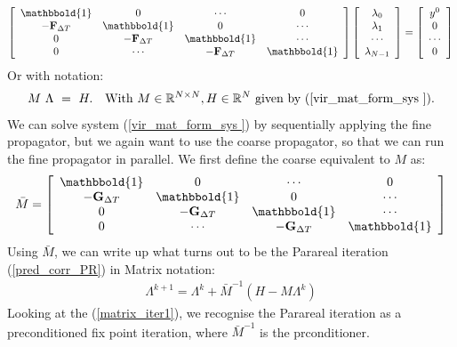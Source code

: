\begin{align}
  \left[ \begin{array}{cccc}
   \mathbbold{1} & 0 & \cdots & 0 \\  
   -\bold{F}_{\Delta T} & \mathbbold{1} & 0 & \cdots \\ 
   0 &-\bold{F}_{\Delta T} & \mathbbold{1}  & \cdots \\
   0 &\cdots &-\bold{F}_{\Delta T} & \mathbbold{1}  \\
   \end{array}  \right] 
   \left[ \begin{array}{c}
   \lambda_0 \\
   \lambda_1 \\
   \cdots \\
   \lambda_{N-1} \\
   \end{array}  \right] =
   \left[ \begin{array}{c}
   y^0 \\
   0 \\
   \cdots \\
   0 \\
   \end{array}  \right] \label{vir_mat_form_sys }
\end{align}
Or with notation:
\begin{align}
M \ \Lambda \ = \ H.\quad \textrm{With $M\in\mathbb{R}^{N\times N},H\in\mathbb{R}^N$ given by (\ref{vir_mat_form_sys }).} \label{vir_mat_sys}
\end{align}
We can solve system (\ref{vir_mat_form_sys }) by sequentially applying the fine propagator, but we again want to use the coarse propagator, so that we can run the fine propagator in parallel. We first define the coarse equivalent to $M$ as:
\begin{align}
\bar{M} = \left[ \begin{array}{cccc}
   \mathbbold{1} & 0 & \cdots & 0 \\  
   -\bold{G}_{\Delta T} & \mathbbold{1} & 0 & \cdots \\ 
   0 &-\bold{G}_{\Delta T} & \mathbbold{1}  & \cdots \\
   0 &\cdots &-\bold{G}_{\Delta T} & \mathbbold{1}   \\
   \end{array}  \right]
\end{align}
Using $\bar{M}$, we can write up what turns out to be the Parareal iteration (\ref{pred_corr_PR}) in Matrix notation:
\begin{align}
\Lambda^{k+1} = \Lambda^k + \bar{M}^{-1}(H-M\Lambda^k) \label{matrix_iter1}
\end{align}
Looking at the (\ref{matrix_iter1}), we recognise the Parareal iteration as a preconditioned fix point iteration, where $\bar{M}^{-1}$ is the prconditioner.
